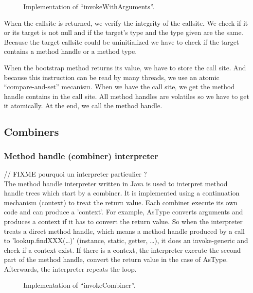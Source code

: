 \documentclass{sig-alternate}
\newcommand{\fixme}[1]{{\color{red} // FIXME #1}\\}
\begin{document}
      \begin{figure}[!h]
        \centering 
        \caption{Implementation of ``invokeWithArguments''.}
        \label{implIWA}
      \end{figure}

      When the callsite is returned, we verify the integrity of the callsite.
      We check if it or its target is not null and if the target's type and the type given are the same.
      Because the target callsite could be uninitialized we have to check if the target contains a method handle or a method type.

      When the bootstrap method returns its value, we have to store the call site.
      And because this instruction can be read by many threads, we use an atomic ``compare-and-set'' mecanism.
      When we have the call site, we get the method handle contains in the call site.
      All method handles are volatiles so we have to get it atomically.
      At the end, we call the method handle.

    \subsection{Combiners}
      \subsubsection{Method handle (combiner) interpreter}

        \fixme{pourquoi un interpreter particulier ?}

        The method handle interpreter written in Java
        is used to interpret method handle trees which start by a combiner.
        It is implemented using a continuation mechanism (context) to treat the return value.
        Each combiner execute its own code and can produce a 'context'.
        For example, AsType converts arguments and produces a context if it has to convert the return value.
        So when the interpreter treats a direct method handle,
        which means a method handle produced by a call to 'lookup.findXXX(\dots)' (instance, static, getter, \dots),
        it does an invoke-generic and check if a context exist.
        If there is a context, the interpreter execute the second part of the method handle,
        convert the return value in the case of AsType.
        Afterwards, the interpreter repeats the loop.

        \begin{figure}[!h]
          \centering 
          \caption{Implementation of ``invokeCombiner''.}
          \label{implINTERP}
        \end{figure}
    
\end{document}
